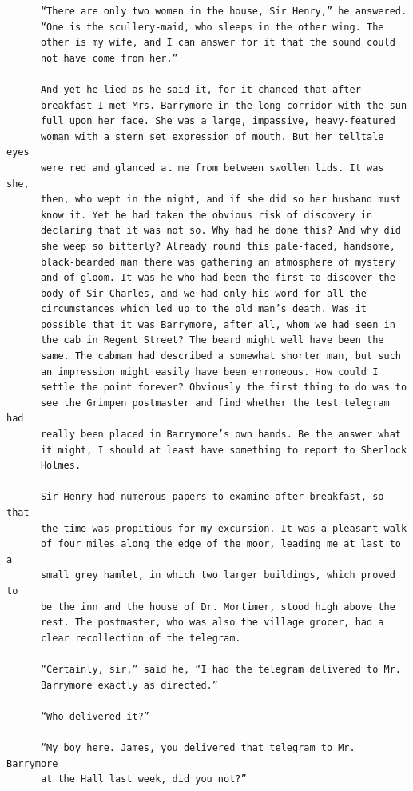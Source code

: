 \documentclass{article}
\begin{document}
\begin{verbatim}
      “There are only two women in the house, Sir Henry,” he answered.
      “One is the scullery-maid, who sleeps in the other wing. The
      other is my wife, and I can answer for it that the sound could
      not have come from her.”

      And yet he lied as he said it, for it chanced that after
      breakfast I met Mrs. Barrymore in the long corridor with the sun
      full upon her face. She was a large, impassive, heavy-featured
      woman with a stern set expression of mouth. But her telltale eyes
      were red and glanced at me from between swollen lids. It was she,
      then, who wept in the night, and if she did so her husband must
      know it. Yet he had taken the obvious risk of discovery in
      declaring that it was not so. Why had he done this? And why did
      she weep so bitterly? Already round this pale-faced, handsome,
      black-bearded man there was gathering an atmosphere of mystery
      and of gloom. It was he who had been the first to discover the
      body of Sir Charles, and we had only his word for all the
      circumstances which led up to the old man’s death. Was it
      possible that it was Barrymore, after all, whom we had seen in
      the cab in Regent Street? The beard might well have been the
      same. The cabman had described a somewhat shorter man, but such
      an impression might easily have been erroneous. How could I
      settle the point forever? Obviously the first thing to do was to
      see the Grimpen postmaster and find whether the test telegram had
      really been placed in Barrymore’s own hands. Be the answer what
      it might, I should at least have something to report to Sherlock
      Holmes.

      Sir Henry had numerous papers to examine after breakfast, so that
      the time was propitious for my excursion. It was a pleasant walk
      of four miles along the edge of the moor, leading me at last to a
      small grey hamlet, in which two larger buildings, which proved to
      be the inn and the house of Dr. Mortimer, stood high above the
      rest. The postmaster, who was also the village grocer, had a
      clear recollection of the telegram.

      “Certainly, sir,” said he, “I had the telegram delivered to Mr.
      Barrymore exactly as directed.”

      “Who delivered it?”

      “My boy here. James, you delivered that telegram to Mr. Barrymore
      at the Hall last week, did you not?”


\end{verbatim}
\end{document}
